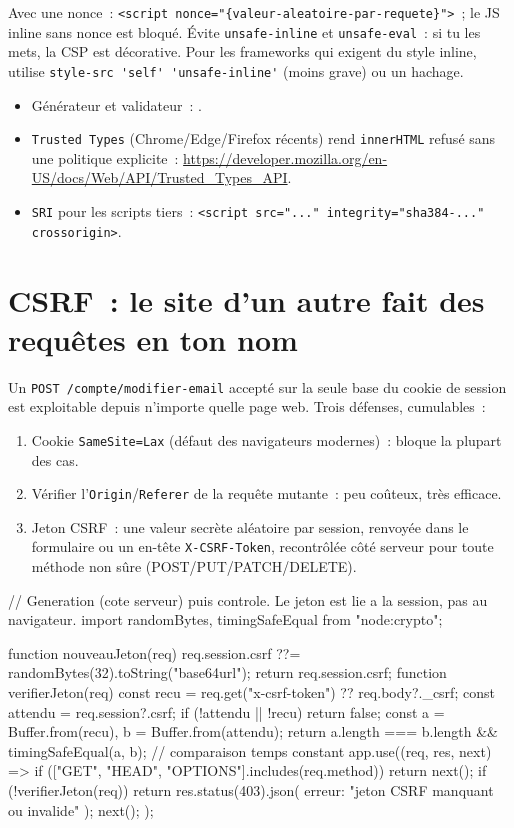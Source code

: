 Avec une nonce~: \verb|<script nonce="{valeur-aleatoire-par-requete}">|~; le JS inline sans nonce
est bloqu\'e. \'Evite \verb|unsafe-inline| et \verb|unsafe-eval|~: si tu les mets, la CSP est
d\'ecorative. Pour les frameworks qui exigent du style inline, utilise
\verb|style-src 'self' 'unsafe-inline'| (moins grave) ou un hachage.

\begin{itemize}
  \item G\'en\'erateur et validateur~: .
  \item \texttt{Trusted Types} (Chrome/Edge/Firefox r\'ecents) rend \texttt{innerHTML} refus\'e sans
        une politique explicite~: \url{https://developer.mozilla.org/en-US/docs/Web/API/Trusted_Types_API}.
  \item \texttt{SRI} pour les scripts tiers~: \verb|<script src="..." integrity="sha384-..." crossorigin>|.
\end{itemize}

\section{CSRF~: le site d'un autre fait des requ\^etes en ton nom}

Un \verb|POST /compte/modifier-email| accept\'e sur la seule base du cookie de session est
exploitable depuis n'importe quelle page web. Trois d\'efenses, cumulables~:

\begin{enumerate}
  \item Cookie \verb|SameSite=Lax| (d\'efaut des navigateurs modernes)~: bloque la plupart des cas.
  \item V\'erifier l'\verb|Origin|/\verb|Referer| de la requ\^ete mutante~: peu co\^uteux, tr\`es efficace.
  \item Jeton CSRF~: une valeur secr\`ete al\'eatoire par session, renvoy\'ee dans le formulaire ou
        un en-t\^ete \verb|X-CSRF-Token|, recontr\^ol\'ee c\^ot\'e serveur pour toute m\'ethode
        non s\^ure (POST/PUT/PATCH/DELETE).
\end{enumerate}

\begin{codejs}
// Generation (cote serveur) puis controle. Le jeton est lie a la session, pas au navigateur.
import { randomBytes, timingSafeEqual } from "node:crypto";

function nouveauJeton(req) {
  req.session.csrf ??= randomBytes(32).toString("base64url");
  return req.session.csrf;
}
function verifierJeton(req) {
  const recu = req.get("x-csrf-token") ?? req.body?._csrf;
  const attendu = req.session?.csrf;
  if (!attendu || !recu) return false;
  const a = Buffer.from(recu), b = Buffer.from(attendu);
  return a.length === b.length && timingSafeEqual(a, b);       // comparaison temps constant
}
app.use((req, res, next) => {
  if (["GET", "HEAD", "OPTIONS"].includes(req.method)) return next();
  if (!verifierJeton(req)) return res.status(403).json({ erreur: "jeton CSRF manquant ou invalide" });
  next();
});
\end{codejs}

